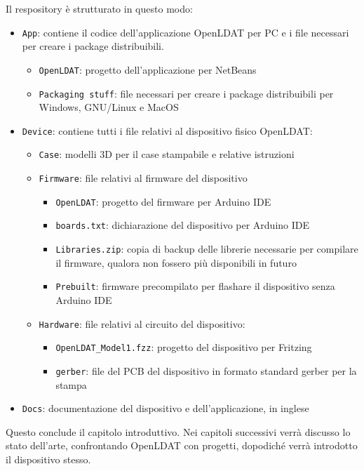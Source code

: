 Il respository è strutturato in questo modo:\begin{itemize}
	\item \texttt{App}: contiene il codice dell'applicazione OpenLDAT per PC e i file necessari per creare i package distribuibili. \begin{itemize}
		\item \texttt{OpenLDAT}: progetto dell'applicazione per NetBeans
		\item \texttt{Packaging stuff}: file necessari per creare i package distribuibili per Windows, GNU/Linux e MacOS
	\end{itemize}
	\item \texttt{Device}: contiene tutti i file relativi al dispositivo fisico OpenLDAT: \begin{itemize}
		\item \texttt{Case}: modelli 3D per il case stampabile e relative istruzioni
		\item \texttt{Firmware}: file relativi al firmware del dispositivo \begin{itemize}
			\item \texttt{OpenLDAT}: progetto del firmware per Arduino IDE
			\item \texttt{boards.txt}: dichiarazione del dispositivo per Arduino IDE
			\item \texttt{Libraries.zip}: copia di backup delle librerie necessarie per compilare il firmware, qualora non fossero più disponibili in futuro
			\item \texttt{Prebuilt}: firmware precompilato per flashare il dispositivo senza Arduino IDE
		\end{itemize}
		\item \texttt{Hardware}: file relativi al circuito del dispositivo: \begin{itemize}
			\item \texttt{OpenLDAT\_Model1.fzz}: progetto del dispositivo per Fritzing
			\item \texttt{gerber}: file del PCB del dispositivo in formato standard gerber per la stampa
		\end{itemize}
	\end{itemize}
	\item \texttt{Docs}: documentazione del dispositivo e dell'applicazione, in inglese
\end{itemize}

Questo conclude il capitolo introduttivo. Nei capitoli successivi verrà discusso lo stato dell'arte, confrontando OpenLDAT con progetti, dopodiché verrà introdotto il dispositivo stesso.
